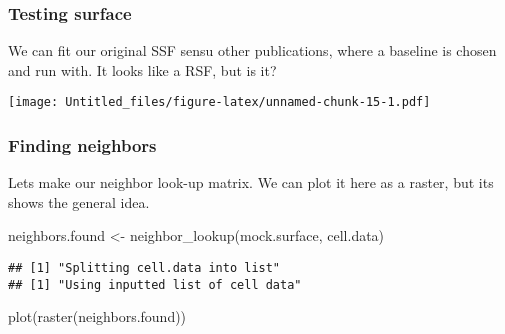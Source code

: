 \documentclass[
]{article}
\newenvironment{Shaded}{\begin{snugshade}}{\end{snugshade}}
\newcommand{\AttributeTok}[1]{\textcolor[rgb]{0.77,0.63,0.00}{#1}}
\newcommand{\FloatTok}[1]{\textcolor[rgb]{0.00,0.00,0.81}{#1}}
\newcommand{\FunctionTok}[1]{\textcolor[rgb]{0.00,0.00,0.00}{#1}}
\newcommand{\NormalTok}[1]{#1}
\newcommand{\OtherTok}[1]{\textcolor[rgb]{0.56,0.35,0.01}{#1}}
\newcommand{\SpecialCharTok}[1]{\textcolor[rgb]{0.00,0.00,0.00}{#1}}
\newcommand{\StringTok}[1]{\textcolor[rgb]{0.31,0.60,0.02}{#1}}
\begin{document}
\hypertarget{testing-surface}{%
\subsubsection{Testing surface}\label{testing-surface}}

We can fit our original SSF sensu other publications, where a baseline
is chosen and run with. It looks like a RSF, but is it?

\begin{Shaded}
\end{Shaded}

\texttt{[image: Untitled\_files/figure-latex/unnamed-chunk-15-1.pdf]}

\hypertarget{finding-neighbors}{%
\subsubsection{Finding neighbors}\label{finding-neighbors}}

Lets make our neighbor look-up matrix. We can plot it here as a raster,
but its shows the general idea.

\begin{Shaded}
\begin{Highlighting}[]
\NormalTok{neighbors.found }\OtherTok{\textless{}{-}} \FunctionTok{neighbor\_lookup}\NormalTok{(mock.surface, cell.data)}
\end{Highlighting}
\end{Shaded}

\begin{verbatim}
## [1] "Splitting cell.data into list"
## [1] "Using inputted list of cell data"
\end{verbatim}

\begin{Shaded}
\begin{Highlighting}[]
\FunctionTok{plot}\NormalTok{(}\FunctionTok{raster}\NormalTok{(neighbors.found))}
\end{Highlighting}
\end{Shaded}
\end{document}
